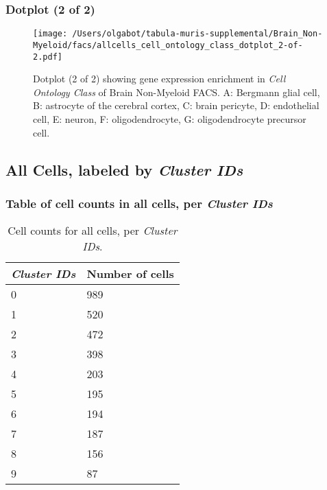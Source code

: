 \clearpage

\subsubsection{Dotplot (2 of 2)}
\begin{figure}[h]
\centering
\texttt{[image: /Users/olgabot/tabula-muris-supplemental/Brain\_Non-Myeloid/facs/allcells\_cell\_ontology\_class\_dotplot\_2-of-2.pdf]}

\caption{ Dotplot (2 of 2)  showing gene expression enrichment in \emph{Cell Ontology Class} of Brain Non-Myeloid FACS. A: Bergmann glial cell, B: astrocyte of the cerebral cortex, C: brain pericyte, D: endothelial cell, E: neuron, F: oligodendrocyte, G: oligodendrocyte precursor cell.}
\end{figure}


\clearpage

\subsection{All Cells, labeled by \emph{Cluster IDs}}
\subsubsection{Table of cell counts in all cells, per \emph{Cluster IDs}}\begin{table}[h]
\centering
\label{my-label}
\begin{tabular}{@{}ll@{}}
\toprule

\emph{Cluster IDs}& Number of cells \\ \midrule
0 & 989 \\

1 & 520 \\

2 & 472 \\

3 & 398 \\

4 & 203 \\

5 & 195 \\

6 & 194 \\

7 & 187 \\

8 & 156 \\

9 & 87 \\
\bottomrule
\end{tabular}
\caption{Cell counts for all cells, per \emph{Cluster IDs}.}
\end{table}

